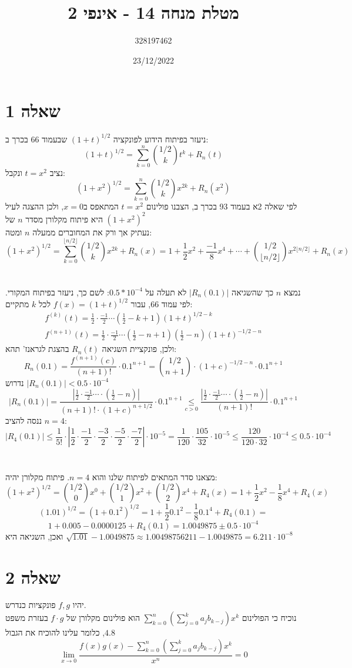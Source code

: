 \documentclass{article}
\title{מטלת מנחה 14 - אינפי 2}
\author{328197462}
\date{23/12/2022}
\newcommand\underrel[2]{\mathrel{\mathop{#2}\limits_{#1}}}
\begin{document}
\long{}
\maketitle

\section*{שאלה 1}

ניעזר בפיתוח הידוע לפונקציה $(1+t)^{1/2}$
שבעמוד 66 בכרך ב:
\[
    (1+t)^{1/2} = \sum_{k=0}^n \binom{1/2}{k}t^k+R_n(t)
\]
נציב $t=x^2$ ונקבל:
\[
    (1+x^2)^{1/2} = \sum_{k=0}^n \binom{1/2}{k}x^{2k}+R_n(x^2)
\]
לפי שאלה 2א בעמוד 93 בכרך ב, הצבנו פולינום $t=x^2$ המתאפס ב$x=0$,
ולכן ההצגה לעיל היא פיתוח מקלורן מסדר $n$ של $(1+x^2)^2$\\
נעתיק אך ורק את המחוברים ממעלה $n$ ומטה:
\[
    (1+x^2)^{1/2} =
    \sum_{k=0}^{\lfloor n/2 \rfloor} \binom{1/2}{k}x^{2k} + R_n(x) = 1 + \frac{1}{2}x^2+\frac{-1}{8}x^4+\cdots + \binom{1/2}{\lfloor n/2 \rfloor}x^{2\lfloor n/2 \rfloor} + R_n(x)
\]
\\\\
נמצא $n$ כך שהשגיאה $|R_n(0.1)|$ לא תעלה על $0.5*10^{-4}$:
לשם כך, ניעזר בפיתוח המקורי. לפי עמוד 66, עבור $f(x)=(1+t)^{1/2}$ לכל $k$ מתקיים:
\[
    \begin{matrix}
        f^{(k)}(t)=\frac{1}{2}\cdot \frac{-1}{2} \cdots (\frac{1}{2}-k+1)(1+t)^{1/2-k} \\
        f^{(n+1)}(t)=\frac{1}{2}\cdot \frac{-1}{2} \cdots (\frac{1}{2}-n+1)(\frac{1}{2}-n)(1+t)^{-1/2-n}
    \end{matrix}
\]
ולכן, פונקציית השגיאה $R_n(t)$ בהצגת לגראנז' תהא:
\[
    R_n(0.1) = \frac{f^{(n+1)}(c)}{(n+1)!} \cdot 0.1^{n+1}=
    \binom{1/2}{n+1}\cdot (1+c)^{-1/2-n} \cdot 0.1^{n+1}
\]
נדרוש $|R_n(0.1)|<0.5\cdot 10^{-4}$
\[
    |R_n(0.1)| =
    \frac{|\frac{1}{2} \cdot \frac{-1}{2} \cdots \cdot (\frac{1}{2}-n)|}{(n+1)!\cdot (1+c)^{n+1/2}} \cdot 0.1^{n+1} \underrel{c>0}{\leq}
    \frac{|\frac{1}{2} \cdot \frac{-1}{2} \cdots \cdot (\frac{1}{2}-n)|}{(n+1)!} \cdot 0.1^{n+1}
\]
ננסה להציב $n=4$:
\[
    |R_4(0.1)|\leq \frac{1}{5!} \cdot |\frac{1}{2}\cdot \frac{-1}{2}\cdot \frac{-3}{2}\cdot \frac{-5}{2} \cdot \frac{-7}{2}| \cdot 10^{-5} =
    \frac{1}{120} \cdot \frac{105}{32} \cdot 10^{-5} \leq
    \frac{120}{120\cdot 32} \cdot 10^{-4} \leq 0.5 \cdot 10^{-4}
\]
\\\\
מצאנו סדר המתאים לפיתוח שלנו והוא $n=4$. פיתוח מקלורן יהיה:
\[
    (1+x^2)^{1/2} = \binom{1/2}{0}x^0+\binom{1/2}{1}x^2+\binom{1/2}{2}x^4 + R_4(x) =
    1+\frac{1}{2}x^2-\frac{1}{8}x^4+R_4(x)
\]
\[
    (1.01)^{1/2}=(1+0.1^2)^{1/2}=1+\frac{1}{2}0.1^2 - \frac{1}{8}0.1^4+R_4(0.1) =
\]
\[
    1 + 0.005 - 0.0000125 + R_4(0.1) = 1.0049875 \pm 0.5 \cdot 10^{-4}
\]
ואכן, השגיאה היא $\sqrt{1.01}-1.0049875\approx 1.00498756211 - 1.0049875 = 6.211\cdot 10^{-8}$

\section*{שאלה 2}

יהיו $f,g$ פונקציות כנדרש. \\
נוכיח כי הפולינום $\sum_{k=0}^{n}(\sum_{j=0}^ka_jb_{k-j})x^k$
הוא פולינום מקלורן של $f\cdot g$ בעזרת משפט $4.8$,
כלומר עלינו להוכיח את הגבול
\[
    \lim_{x\rightarrow 0} \frac{f(x)g(x)-\sum_{k=0}^{n}(\sum_{j=0}^ka_jb_{k-j})x^k}{x^n}=0
\]
\end{document}
